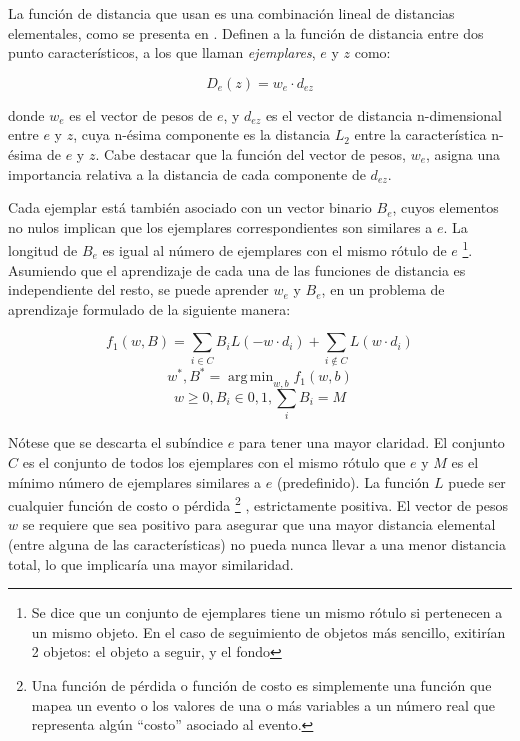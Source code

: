 \documentclass[a4paper,10pt]{article}
\DeclareMathOperator*{\argmin}{arg\,min}
\begin{document}
La función de distancia que usan es una combinación lineal de distancias
elementales, como se presenta en \cite{malisiewicz-cvpr08}. Definen a la
función de distancia entre dos punto característicos, a los que llaman
\textit{ejemplares}, $e$ y $z$ como:

\begin{equation}
    \label{eq:distance-exemplar}
    D_{e}(z) = w_{e} \cdot d_{ez}
\end{equation}

donde $w_{e}$ es el vector de pesos de $e$, y $d_{ez}$ es el vector de
distancia n-dimensional entre $e$ y $z$, cuya n-ésima componente es la
distancia $L_{2}$ entre la característica n-ésima de $e$ y $z$. Cabe destacar
que la función del vector de pesos, $w_{e}$, asigna una importancia relativa a
la distancia de cada componente de $d_{ez}$.

Cada ejemplar está también asociado con un vector binario $B_{e}$, cuyos elementos
no nulos implican que los ejemplares correspondientes son similares a $e$. La
longitud de $B_{e}$ es igual al número de ejemplares con el mismo rótulo de $e$
\footnote{Se dice que un conjunto de ejemplares tiene un mismo rótulo si pertenecen a un mismo objeto. En el caso de seguimiento de objetos
más sencillo, exitirían 2 objetos: el objeto a seguir, y el fondo}.
Asumiendo que el aprendizaje de cada una de las funciones de distancia es
independiente del resto, se puede aprender $w_{e}$ y $B_{e}$, en un problema
de aprendizaje formulado de la siguiente manera:

\begin{equation}
    \label{eq:learning-problem}
    f_{1}(w,B) = \sum_{i \in C} B_{i}L(-w \cdot d_{i}) + \sum_{i\notin C}L(w \cdot d_{i})
\end{equation}
\begin{equation}
    {w^{*}, B^{*} = \argmin_{w,b} f_{1} (w,b) }
\end{equation}
\begin{equation}
   w \geq 0, B_{i} \in {0,1}, \sum_{i} B_{i} = M
\end{equation}

Nótese que se descarta el subíndice $e$ para tener una mayor claridad.
El conjunto $C$ es el conjunto de todos los ejemplares con el mismo rótulo que $e$ y $M$
es el mínimo número de ejemplares similares a $e$ (predefinido). La función $L$ puede ser
cualquier función de costo o pérdida
\footnote{Una función de pérdida o función de costo es simplemente una función que mapea un evento o los valores de una o más variables
a un número real que representa algún ``costo'' asociado al evento.}
, estrictamente positiva.
El vector de pesos $w$
se requiere que sea positivo para asegurar que una mayor distancia elemental (entre
alguna de las características) no pueda nunca llevar a una menor distancia total,
lo que implicaría una mayor similaridad.
\end{document}
